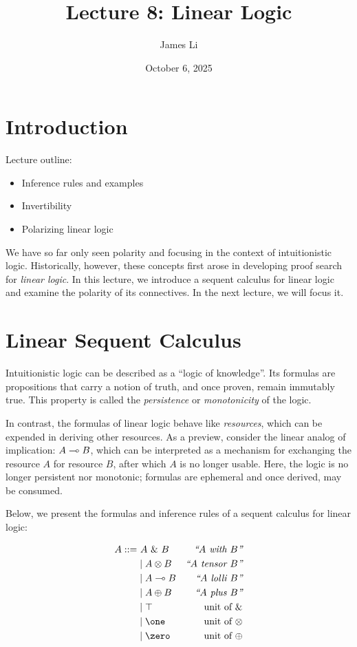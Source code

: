 \documentclass{article}
\title{Lecture 8: Linear Logic}
\author{James Li}
\date{October 6, 2025}
\begin{document}
\maketitle 

\section{Introduction}

Lecture outline: 
\begin{itemize}
  \item Inference rules and examples
  \item Invertibility
  \item Polarizing linear logic
\end{itemize}

We have so far only seen polarity and focusing in the context of intuitionistic logic. Historically, however, these concepts first arose in developing proof search for {\em linear logic}. In this lecture, we introduce a sequent calculus for linear logic and examine the polarity of its connectives. In the next lecture, we will focus it. 


\section{Linear Sequent Calculus}

Intuitionistic logic can be described as a ``logic of knowledge''. Its formulas are propositions that carry a notion of truth, and once proven, remain immutably true. This property is called the {\em persistence} or {\em monotonicity} of the logic. 

In contrast, the formulas of linear logic behave like {\em resources}, which can be expended in deriving other resources. As a preview, consider the linear analog of implication: $A \multimap B$, which can be interpreted as a mechanism for exchanging the resource $A$ for resource $B$, after which $A$ is no longer usable. Here, the logic is no longer persistent nor monotonic; formulas are ephemeral and once derived, may be consumed. 

Below, we present the formulas and inference rules of a sequent calculus for linear logic:

\begin{align*}
  A ::= & ~A~\with~B              & \text{\em ``$A$ with $B$''} \\
        & \mid A \tensor B    & \text{\em ``$A$ tensor $B$''} \\
        & \mid A \lolli B  & \text{\em ``$A$ lolli $B$''} \\ 
        & \mid A \linPlus B     & \text{\em ``$A$ plus $B$''} \\
        & \mid \top           & \text{unit of $\with$} \\
        & \mid \one        & \text{unit of $\tensor$} \\
        & \mid \zero         & \text{unit of $\linPlus$}
\end{align*}
\end{document}
